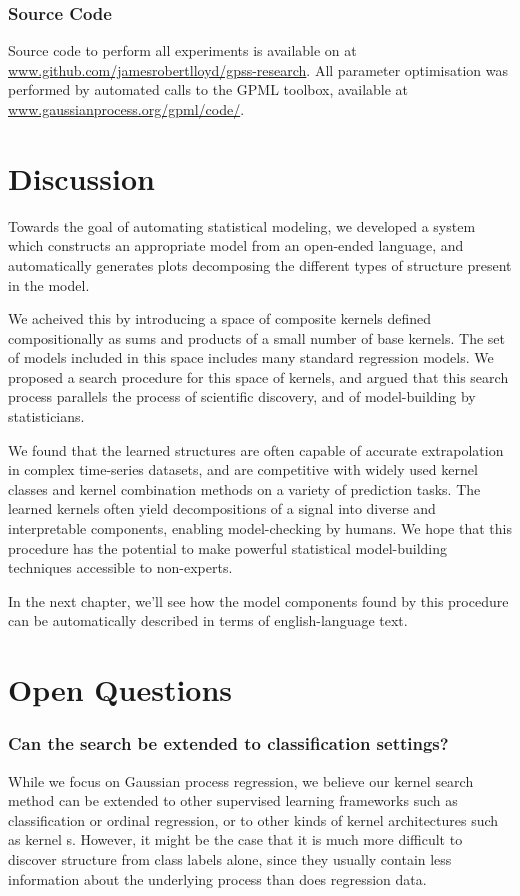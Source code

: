 \subsubsection{Source Code}
Source code to perform all experiments is available on at \url{www.github.com/jamesrobertlloyd/gpss-research}. 
All \gp{} parameter optimisation was performed by automated calls to the GPML toolbox, available at \url{www.gaussianprocess.org/gpml/code/}.


\section{Discussion}

Towards the goal of automating statistical modeling, we developed a system which constructs an appropriate model from an open-ended language, and automatically generates plots decomposing the different types of structure present in the model.

We acheived this by introducing a space of composite kernels defined compositionally as sums and products of a small number of base kernels.  
The set of models included in this space includes many standard regression models.
We proposed a search procedure for this space of kernels, and argued that this search process parallels the process of scientific discovery, and of model-building by statisticians.

We found that the learned structures are often capable of accurate extrapolation in complex time-series datasets, and are competitive with widely used kernel classes and kernel combination methods on a variety of prediction tasks.
The learned kernels often yield decompositions of a signal into diverse and interpretable components, enabling model-checking by humans.
We hope that this procedure has the potential to make powerful statistical model-building techniques accessible to non-experts.

In the next chapter, we'll see how the model components found by this procedure can be automatically described in terms of english-language text.


\section{Open Questions}

\subsubsection{Can the search be extended to classification settings?}
While we focus on Gaussian process regression, we believe our kernel search method can be extended to other supervised learning frameworks such as classification or ordinal regression, or to other kinds of kernel architectures such as kernel \SVM{}s.
However, it might be the case that it is much more difficult to discover structure from class labels alone, since they usually contain less information about the underlying process than does regression data.

